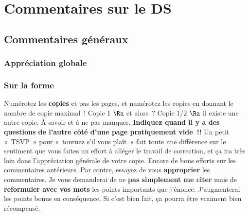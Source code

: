 \documentclass[a4paper, 10pt, final, garamond]{book}
\begin{document}
\setcounter{chapter}{3}

\def\lspace{25}

\chapter{Commentaires sur le DS }

\section{Commentaires généraux}
\subsection{Appréciation globale}
\subsection{Sur la forme}
Numérotez les \textbf{copies} et pas les pages, et numérotez les copies en
donnant le nombre de copie maximal~! Copie 1 $\Ra$ et alors~? Copie 1/2 $\Ra$ il
existe une autre copie. À savoir et à ne pas manquer.
\smallbreak
\textbf{Indiquez quand il y a des questions de l'autre côté d'une page
	pratiquement vide~!!} Un petit «~TSVP~» pour «~tournez s'il vous plaît~» fait
toute une différence sur le sentiment que vous faites un effort à alléger le
travail de correction, et ça ira très loin dans l'appréciation générale de votre
copie.
\smallbreak
Encore de bons efforts sur les commentaires antérieurs. Par contre, essayez de
vous \textbf{approprier} les commentaires. Je vous demanderai de ne \textbf{pas
	simplement me citer} mais de \textbf{reformuler avec vos mots} les points
importants que j'énonce. J'augmenterai les points bonus en conséquence. Si c'est
bien fait, ça pourra être vraiment bien récompensé.
\end{document}
